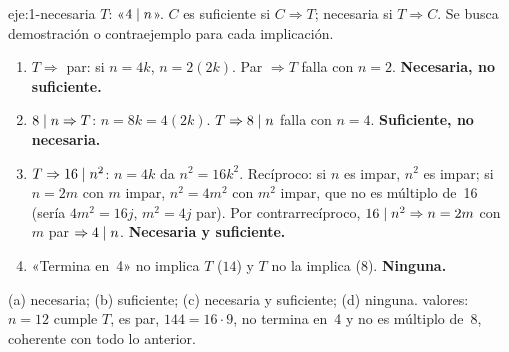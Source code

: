 \begin{solucion}{eje:1-necesaria}
\datos $T$: «$4\mid n$».
\planteamiento $C$ es suficiente si $C\Rightarrow T$; necesaria si $T\Rightarrow C$. Se busca demostración o contraejemplo para cada implicación.
\pasos
\begin{enumerate}[label=(\alph*)]
  \item $T\Rightarrow$ par: si $n=4k$, $n=2(2k)$. Par $\Rightarrow T$ falla con $n=2$. \textbf{Necesaria, no suficiente.}
  \item $8\mid n\Rightarrow T$: $n=8k=4(2k)$. $T\Rightarrow 8\mid n$ falla con $n=4$. \textbf{Suficiente, no necesaria.}
  \item $T\Rightarrow 16\mid n^{2}$: $n=4k$ da $n^{2}=16k^{2}$. Recíproco: si $n$ es impar, $n^{2}$ es impar; si $n=2m$ con $m$ impar, $n^{2}=4m^{2}$ con $m^{2}$ impar, que no es múltiplo de~16 (sería $4m^{2}=16j$, $m^{2}=4j$ par). Por contrarrecíproco, $16\mid n^{2}\Rightarrow n=2m$ con $m$ par $\Rightarrow 4\mid n$. \textbf{Necesaria y suficiente.}
  \item «Termina en~4» no implica $T$ ($14$) y $T$ no la implica ($8$). \textbf{Ninguna.}
\end{enumerate}
\resultado (a) necesaria; (b) suficiente; (c) necesaria y suficiente; (d) ninguna.
\comprobacion valores: $n=12$ cumple $T$, es par, $144=16\cdot 9$, no termina en~4 y no es múltiplo de~8, coherente con todo lo anterior.
\end{solucion}

